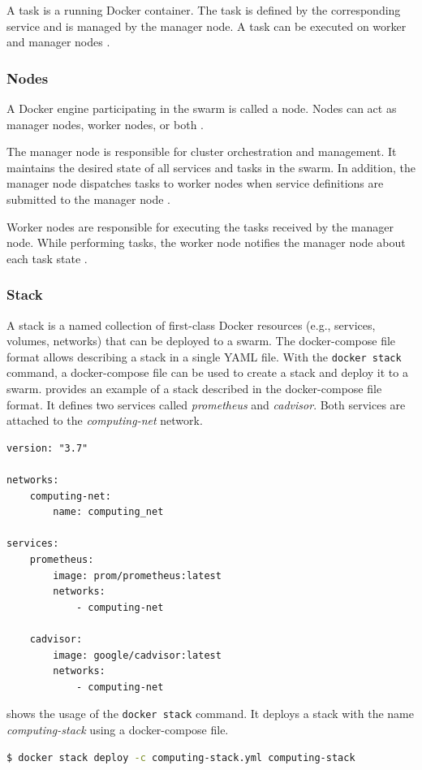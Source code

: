 A task is a running Docker container. The task is defined by the corresponding service and is managed by the manager node. A task can be executed on worker and manager nodes \cite{Docker2020Docs}.


\subsubsection{Nodes}
A Docker engine participating in the swarm is called a node.
Nodes can act as manager nodes, worker nodes, or both \cite{Docker2020Docs}.


The manager node is responsible for cluster orchestration and management. It maintains the desired state of all services and tasks in the swarm. In addition, the manager node dispatches tasks to worker nodes when service definitions are submitted to the manager node \cite{Docker2020Docs}.


Worker nodes are responsible for executing the tasks received by the manager node. While performing tasks, the worker node notifies the manager node about each task state \cite{Docker2020Docs}.


\subsubsection{Stack}
%
A stack is a named collection of first-class Docker resources (e.g., services, volumes, networks) that can be deployed to a swarm.
%
The docker-compose file format allows describing a stack in a single YAML file. With the \texttt{docker stack} command, a docker-compose file can be used to create a stack and deploy it to a swarm.
 provides an example of a stack described in the docker-compose file format.
It defines two services called \textit{prometheus} and \textit{cadvisor}. Both services are attached to the \textit{computing-net} network.
\begin{lstlisting}[label=lst:04_docker_swarm_stack_compose, caption=Basic example of stack describes in the docker-compose file format]
version: "3.7"

networks:
    computing-net:
        name: computing_net

services:
    prometheus:
        image: prom/prometheus:latest
        networks:
            - computing-net
            
    cadvisor:
        image: google/cadvisor:latest
        networks:
            - computing-net        
\end{lstlisting}
 shows the usage of the \texttt{docker stack} command. It deploys a stack with the name \textit{computing-stack} using a docker-compose file.
\begin{lstlisting}[label=lst:04_docker_swarm_stack_deploy, caption=Usage of the docker stack command to deploy a stack, language=bash, numbers=none]
$ docker stack deploy -c computing-stack.yml computing-stack     
\end{lstlisting}


